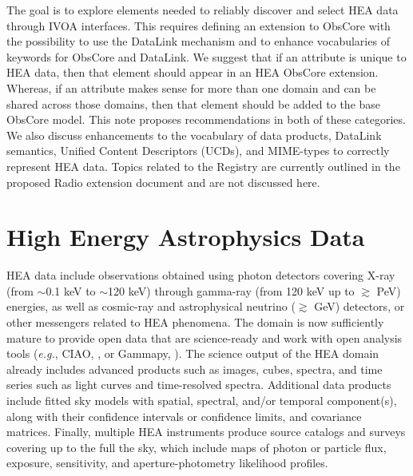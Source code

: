\documentclass[11pt,a4paper]{ivoa}
\begin{document}
The goal is to explore elements needed to reliably discover and select \gls{HEA} data through \gls{IVOA} interfaces. This requires defining an extension to ObsCore with the possibility to use the DataLink mechanism and to enhance vocabularies of keywords for ObsCore and DataLink. We suggest that if an attribute is unique to \gls{HEA} data, then that element should appear in an \gls{HEA} ObsCore extension. Whereas, if an attribute makes sense for more than one domain and can be shared across those domains, then that element should be added to the base ObsCore model. This note proposes recommendations in both of these categories. We also discuss enhancements to the vocabulary of data\/ products, DataLink semantics, Unified Content Descriptors (UCDs), and MIME-types to correctly represent \gls{HEA} data. Topics related to the Registry are currently outlined in the proposed Radio extension document and are not discussed here.


\pagebreak
\section{High Energy Astrophysics Data}

\gls{HEA} data include observations obtained using photon detectors covering X-ray (from $\sim$0.1 keV to $\sim$120 keV) through gamma-ray (from 120 keV up to $\gtrsim$ PeV) energies, as well as cosmic-ray and astrophysical neutrino ($\gtrsim$ GeV) detectors, or other messengers related to \gls{HEA} phenomena. The domain is now sufficiently mature to provide open data that are science-ready and work with open analysis tools ({\em e.g.\/}, CIAO, \citealt{2026ApJ..1005..116F}, or Gammapy, \citealt{gammapy:2023}). The science output of the \gls{HEA} domain already includes advanced products such as images, cubes, spectra, and time series such as light curves and time-resolved spectra. Additional data products include fitted sky models with spatial, spectral, and/or temporal component(s), along with their confidence intervals or confidence limits, and covariance matrices.   Finally, multiple \gls{HEA} instruments produce source catalogs and surveys covering up to the full the sky, which include maps of photon or particle flux, exposure, sensitivity, and aperture-photometry likelihood profiles.
\end{document}
